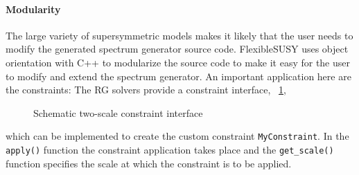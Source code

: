 \documentclass[final,3p,times,pdflatex]{elsarticle}
\newcommand{\code}[1]{\lstinline|#1|}  %
\begin{document}
\paragraph{Modularity}
The large variety of supersymmetric models makes it likely that the
user needs to modify the generated spectrum generator source code.
FlexibleSUSY uses object orientation with C++ to modularize the source
code to make it easy for the user to modify and extend the spectrum
generator.  An important application here are the constraints: The RG
solvers provide a constraint interface,
\figurename~\ref{fig:schematic-two-scale-constraint-interface},
%
\begin{figure}
  \centering
  \caption{Schematic two-scale constraint interface}
  \label{fig:schematic-two-scale-constraint-interface}
\end{figure}
%
which can be implemented to create the custom constraint
\code{MyConstraint}.  In the \code{apply()} function the constraint
application takes place and the \code{get_scale()} function specifies
the scale at which the constraint is to be applied.
\end{document}
